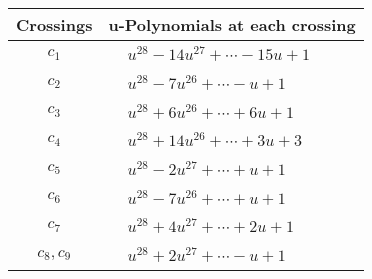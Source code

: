 \documentclass[1p]{elsarticle_modified}
\theoremstyle{definition}
\begin{document}
\begin{tabular}{m{50pt}|m{274pt}}
Crossings & \hspace{64pt}u-Polynomials at each crossing \\
\hline $$\begin{aligned}c_{1}\end{aligned}$$&$\begin{aligned}
&u^{28}-14 u^{27}+\cdots-15 u+1
\end{aligned}$\\
\hline $$\begin{aligned}c_{2}\end{aligned}$$&$\begin{aligned}
&u^{28}-7 u^{26}+\cdots- u+1
\end{aligned}$\\
\hline $$\begin{aligned}c_{3}\end{aligned}$$&$\begin{aligned}
&u^{28}+6 u^{26}+\cdots+6 u+1
\end{aligned}$\\
\hline $$\begin{aligned}c_{4}\end{aligned}$$&$\begin{aligned}
&u^{28}+14 u^{26}+\cdots+3 u+3
\end{aligned}$\\
\hline $$\begin{aligned}c_{5}\end{aligned}$$&$\begin{aligned}
&u^{28}-2 u^{27}+\cdots+u+1
\end{aligned}$\\
\hline $$\begin{aligned}c_{6}\end{aligned}$$&$\begin{aligned}
&u^{28}-7 u^{26}+\cdots+u+1
\end{aligned}$\\
\hline $$\begin{aligned}c_{7}\end{aligned}$$&$\begin{aligned}
&u^{28}+4 u^{27}+\cdots+2 u+1
\end{aligned}$\\
\hline $$\begin{aligned}c_{8},c_{9}\end{aligned}$$&$\begin{aligned}
&u^{28}+2 u^{27}+\cdots- u+1
\end{aligned}$\\

\end{tabular}
\end{document}
